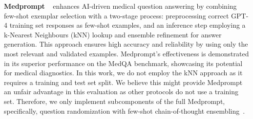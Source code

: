 \documentclass{article}  %
\begin{document}
\textbf{Medprompt} ~\citep{nori2023medprompt} enhances AI-driven medical question answering by combining few-shot exemplar selection with a two-stage process: preprocessing correct GPT-4 training set responses as few-shot examples, and an inference step employing a k-Nearest Neighbours (kNN) lookup and ensemble refinement for answer generation. This approach ensures high accuracy and reliability by using only the most relevant and validated examples. Medprompt's effectiveness is demonstrated in its superior performance on the MedQA benchmark, showcasing its potential for medical diagnostics. In this work, we do not employ the kNN approach as it requires a training and test set split. We believe this might provide Medprompt an unfair advantage in this evaluation as other protocols do not use a training set. Therefore, we only implement subcomponents of the full Medprompt, specifically, question randomization with few-shot chain-of-thought ensembling~\cite{nori2023medprompt}.
\end{document}
